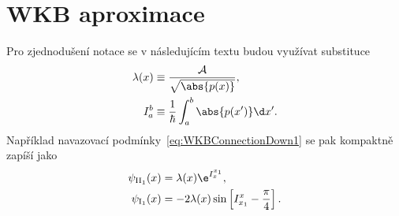 \section{WKB aproximace}

\begin{theory}
	
	
	
        
    \begin{note}[Značení:]
        Pro zjednodušení notace se v následujícím textu budou využívat substituce
		\begin{subequations}
			\begin{align}
				\lambda(x)&\equiv\frac{\mathcal{A}}{\sqrt{\abs{p(x)}}},\\
				I_{a}^{b}&\equiv\frac{1}{\hbar}\int_{a}^{b}\abs{p(x')}\d x'.
				\label{eq:WKBNotation}
			\end{align}					
		\end{subequations}
        Například navazovací podmínky~\eqref{eq:WKBConnectionDown1} se pak kompaktně zapíší jako
		\begin{subequations}
			\begin{align}
				\psi_{\mathrm{II}_{1}}(x)&=\lambda(x)\e^{I_{x}^{x_{1}}},\\
				\psi_{\mathrm{I}_{1}}(x)&=-2\lambda(x)\sin\left[I_{x_{1}}^{x}-\frac{\pi}{4}\right].
			\end{align}				
		\end{subequations}
    \end{note}
\end{theory}



	



